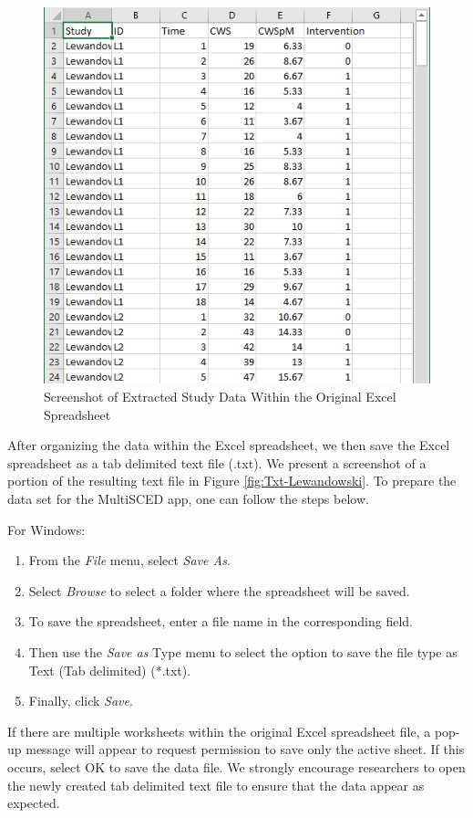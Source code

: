 \documentclass[
]{book}
\providecommand{\tightlist}{%
  \setlength{\itemsep}{0pt}\setlength{\parskip}{0pt}}
\begin{document}
\begin{figure}
\includegraphics[width=0.6\linewidth]{images/excel_Lewandowski2011} \caption{Screenshot of Extracted Study Data Within the Original Excel Spreadsheet}\label{fig:Excel-Lewandowski}
\end{figure}

After organizing the data within the Excel spreadsheet, we then save the Excel spreadsheet as a tab delimited text file (.txt). We present a screenshot of a portion of the resulting text file in Figure \ref{fig:Txt-Lewandowski}. To prepare the data set for the MultiSCED app, one can follow the steps below.

For Windows:

\begin{enumerate}
\def\labelenumi{\arabic{enumi}.}
\tightlist
\item
  From the \emph{File} menu, select \emph{Save As}.
\item
  Select \emph{Browse} to select a folder where the spreadsheet will be saved.
\item
  To save the spreadsheet, enter a file name in the corresponding field.
\item
  Then use the \emph{Save as} Type menu to select the option to save the file type as Text (Tab delimited) (*.txt).
\item
  Finally, click \emph{Save}.
\end{enumerate}

If there are multiple worksheets within the original Excel spreadsheet file, a pop-up message will appear to request permission to save only the active sheet. If this occurs, select OK to save the data file. We strongly encourage researchers to open the newly created tab delimited text file to ensure that the data appear as expected.
\end{document}
